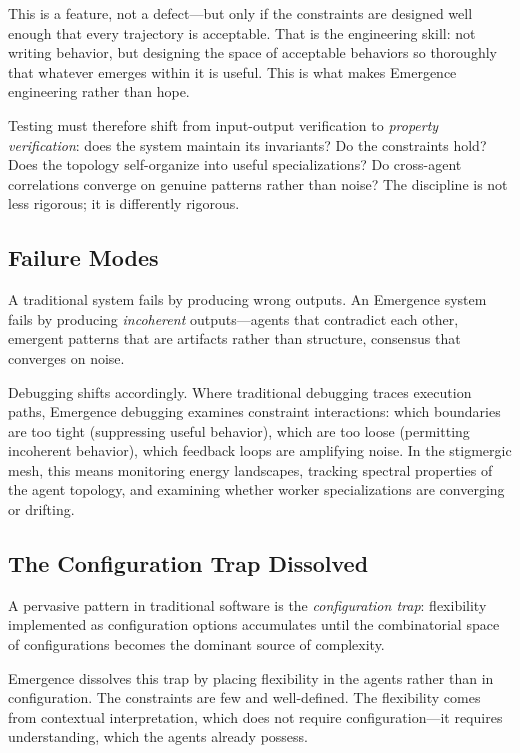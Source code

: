 \documentclass[11pt,twocolumn]{article}
\begin{document}
This is a feature, not a defect---but only if the constraints are
designed well enough that every trajectory is acceptable.  That is the
engineering skill: not writing behavior, but designing the space of
acceptable behaviors so thoroughly that whatever emerges within it is
useful.  This is what makes Emergence engineering rather than hope.

Testing must therefore shift from input-output verification to
\emph{property verification}: does the system maintain its invariants?
Do the constraints hold?  Does the topology self-organize into useful
specializations?  Do cross-agent correlations converge on genuine
patterns rather than noise?  The discipline is not less rigorous; it is
differently rigorous.

\subsection{Failure Modes}

A traditional system fails by producing wrong outputs.  An Emergence
system fails by producing \emph{incoherent} outputs---agents that
contradict each other, emergent patterns that are artifacts rather than
structure, consensus that converges on noise.

Debugging shifts accordingly.  Where traditional debugging traces
execution paths, Emergence debugging examines constraint interactions:
which boundaries are too tight (suppressing useful behavior), which are
too loose (permitting incoherent behavior), which feedback loops are
amplifying noise.  In the stigmergic mesh, this means monitoring energy
landscapes, tracking spectral properties of the agent topology, and
examining whether worker specializations are converging or drifting.

\subsection{The Configuration Trap Dissolved}

A pervasive pattern in traditional software is the \emph{configuration
trap}: flexibility implemented as configuration options accumulates
until the combinatorial space of configurations becomes the dominant
source of complexity.

Emergence dissolves this trap by placing flexibility in the agents
rather than in configuration.  The constraints are few and
well-defined.  The flexibility comes from contextual interpretation,
which does not require configuration---it requires understanding, which
the agents already possess.
\end{document}

